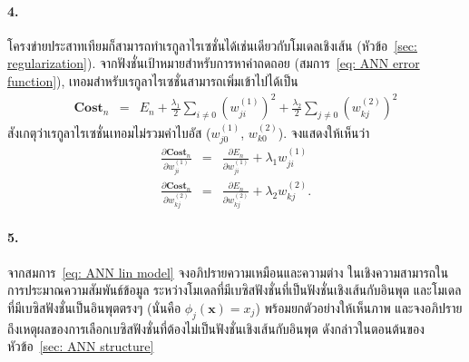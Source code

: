 \paragraph{4.}
โครงข่ายประสาทเทียมก็สามารถทำเรกูลาไรเซชั่นได้เช่นเดียวกับโมเดลเชิงเส้น (หัวข้อ~\ref{sec: regularization}).
จากฟังชั่นเป้าหมายสำหรับการหาค่าถดถอย (สมการ~\ref{eq: ANN error function}), เทอมสำหรับเรกูลาไรเซชั่นสามารถเพิ่มเข้าไปได้เป็น
\begin{eqnarray}
   \mathbf{Cost}_n &=& E_n + \frac{\lambda_1}{2} \sum_{i \neq 0} ( w_{ji}^{(1)} )^2 + \frac{\lambda_2}{2} \sum_{j \neq 0} ( w_{kj}^{(2)} )^2
%   
\label{eq: ann regularized En}   
\end{eqnarray}
สังเกตุว่าเรกูลาไรเซชั่นเทอมไม่รวมค่าไบอัส ($w_{j0}^{(1)}$, $w_{k0}^{(2)}$).
จงแสดงให้เห็นว่า
\begin{eqnarray}
\frac{\partial \mathbf{Cost}_n}{\partial w_{ji}^{(1)}} &=& \frac{\partial E_n}{\partial w_{ji}^{(1)}} + \lambda_1 w_{ji}^{(1)}
\label{eq: ann regularized derivative 1} \\
\frac{\partial \mathbf{Cost}_n}{\partial w_{kj}^{(2)}} &=& \frac{\partial E_n}{\partial w_{kj}^{(2)}} + \lambda_2 w_{kj}^{(2)}.
\label{eq: ann regularized derivative 2}
\end{eqnarray}

\paragraph{5.}
จากสมการ~\ref{eq: ANN lin model}
จงอภิปรายความเหมือนและความต่าง ในเชิงความสามารถในการประมาณความสัมพันธ์ข้อมูล
ระหว่างโมเดลที่มีเบซิสฟังชั่นที่เป็นฟังชั่นเชิงเส้นกับอินพุต
และโมเดลที่มีเบซิสฟังชั่นเป็นอินพุตตรงๆ (นั่นคือ $\phi_j(\mathbf{x}) = x_j$)
พร้อมยกตัวอย่างให้เห็นภาพ
และจงอภิปรายถึงเหตุผลของการเลือกเบซิสฟังชั่นที่ต้องไม่เป็นฟังชั่นเชิงเส้นกับอินพุต ดังกล่าวในตอนต้นของหัวข้อ~\ref{sec: ANN structure}

